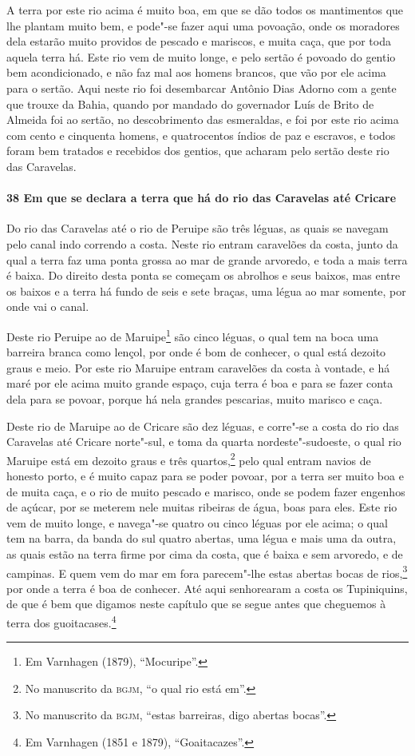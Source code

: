 \begin{linenumbers}
A terra por este rio acima é muito boa, em que se dão todos os mantimentos que lhe plantam
muito bem, e pode"-se fazer aqui uma povoação, onde os moradores dela estarão muito
providos de pescado e mariscos, e muita caça, que por toda aquela terra há. Este rio vem
de muito longe, e pelo sertão é povoado do gentio bem acondicionado, e não faz mal aos
homens brancos, que vão por ele acima para o sertão. Aqui neste rio foi desembarcar
Antônio Dias Adorno com a gente que trouxe da Bahia, quando por mandado do governador Luís
de Brito de Almeida foi ao sertão, no descobrimento das esmeraldas, e foi por este rio
acima com cento e cinquenta homens, e quatrocentos índios de paz e escravos, e todos foram
bem tratados e recebidos dos gentios, que acharam pelo sertão deste rio das Caravelas.

\paragraph{38 Em que se declara a terra que há do rio das Caravelas até Cricare} \quad
Do rio das Caravelas até o rio de Peruipe são três léguas, as quais se navegam pelo canal
indo correndo a costa. Neste rio entram caravelões da costa, junto da qual a terra faz uma
ponta grossa ao mar de grande arvoredo, e toda a mais terra é baixa. Do direito desta
ponta se começam os abrolhos e seus baixos, mas entre os baixos e a terra há fundo de seis
e sete braças, uma légua ao mar somente, por onde vai o canal.

Deste rio Peruipe ao de Maruipe\footnote{ Em Varnhagen (1879), ``Mocuripe''.} são cinco
léguas, o qual tem na boca uma barreira branca como lençol, por onde é bom de conhecer, o
qual está dezoito graus e meio. Por este rio Maruipe entram caravelões da costa à vontade,
e há maré por ele acima muito grande espaço, cuja terra é boa e para se fazer conta dela
para se povoar, porque há nela grandes pescarias, muito marisco e caça.

Deste rio de Maruipe ao de Cricare são dez léguas, e corre"-se a costa do rio das Caravelas
até Cricare norte"-sul, e toma da quarta nordeste"-sudoeste, o qual rio Maruipe está em
dezoito graus e três quartos,\footnote{ No manuscrito da \textsc{bgjm}, ``o qual rio está
em''.} pelo qual entram navios de honesto porto, e é muito capaz para se poder povoar, por
a terra ser muito boa e de muita caça, e o rio de muito pescado e marisco, onde se podem
fazer engenhos de açúcar, por se meterem nele muitas ribeiras de água, boas para eles.
Este rio vem de muito longe, e navega"-se quatro ou cinco léguas por ele acima; o qual tem
na barra, da banda do sul quatro abertas, uma légua e mais uma da outra, as quais estão na
terra firme por cima da costa, que é baixa e sem arvoredo, e de campinas. E quem vem do
mar em fora parecem"-lhe estas abertas bocas de rios,\footnote{ No manuscrito da
\textsc{bgjm}, ``estas barreiras, digo abertas bocas''.} por onde a terra é boa de
conhecer. Até aqui senhorearam a costa os Tupiniquins, de que é bem que digamos neste
capítulo que se segue antes que cheguemos à terra dos guoitacases.\footnote{ Em Varnhagen
(1851 e 1879), ``Goaitacazes''.}


\end{linenumbers}
